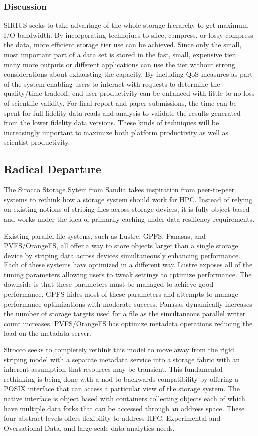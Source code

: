 \subsubsection{Discussion}
SIRIUS seeks to take advantage of the whole storage hierarchy to get maximum
I/O bandwidth. By incorporating technqiues to slice, compress, or lossy
compress the data, more efficient storage tier use can be achieved. Since only
the small, most important part of a data set is stored in the fast, small,
expensive tier, many more outputs or different applications can use the tier
without strong considerations about exhausting the capacity. By including QoS
measures as part of the system enabling users to interact with requests to
determine the quality/time tradeoff, end user productivity can be enhanced with
little to no loss of scientific validity. For final report and paper
submissions, the time can be spent for full fidelity data reads and analysis to
validate the results generated from the lower fidelity data versions. These
kinds of techniques will be increasingly important to maximize both platform
productivity as well as scientist productivity.

\subsection{Radical Departure}
The Sirocco Storage Sytem from Sandia takes inspiration from peer-to-peer
systems to rethink how a storage system should work for HPC. Instead of relying
on existing notions of striping files across storage devices, it is fully
object based and works under the idea of primarily caching under data
resiliency requirements.

Existing parallel file systems, such as Lustre, GPFS, Panasas, and
PVFS/OrangeFS, all offer a way to store objects larger than a single storage
device by striping data across devices simultaneously enhancing performance.
Each of these systems have optimized in a different way. Lustre exposes all of
the tuning parameters allowing users to tweak settings to optimize performance.
The downside is that these parameters must be managed to achieve good
performance. GPFS hides most of these parameters and attempts to manage
performance optimizations with moderate success. Panasas dynamically increases
the number of storage targets used for a file as the simultaneous parallel
writer count increases. PVFS/OrangeFS has optimize metadata operations reducing
the load on the metadata server.

Sirocco seeks to completely rethink this model to move away from the rigid
striping model with a separate metadata service into a storage fabric with an
inherent assumption that resources may be transient. This fundamental
rethinking is being done with a nod to backwards compatibility by offering a
POSIX interface that can access a particular view of the storage system. The
native interface is object based with containers collecting objects each of
which have multiple data forks that can be accessed through an address space.
These four abstract levels offers flexibility to address HPC, Experimental and
Oversational Data, and large scale data analytics needs.

